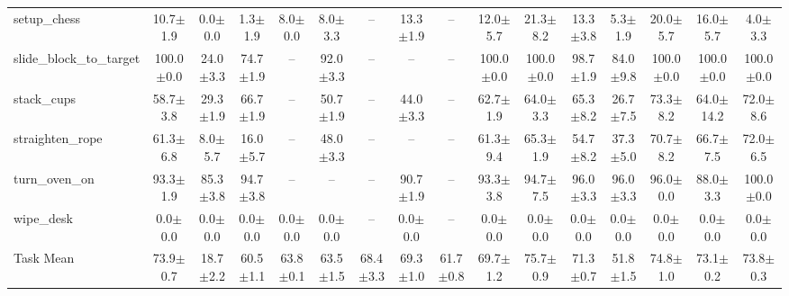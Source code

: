 \begin{table}[t]
{\begin{tabular}{l*{15}{c}}
setup\_chess & 10.7$\pm$1.9 & 0.0$\pm$0.0 & 1.3$\pm$1.9 & 8.0$\pm$0.0 & 8.0$\pm$3.3 & -- & 13.3$\pm$1.9 & -- & 12.0$\pm$5.7 & 21.3$\pm$8.2 & 13.3$\pm$3.8 & 5.3$\pm$1.9 & 20.0$\pm$5.7 & 16.0$\pm$5.7 & 4.0$\pm$3.3 \\
slide\_block\_to\_target & 100.0$\pm$0.0 & 24.0$\pm$3.3 & 74.7$\pm$1.9 & -- & 92.0$\pm$3.3 & -- & -- & -- & 100.0$\pm$0.0 & 100.0$\pm$0.0 & 98.7$\pm$1.9 & 84.0$\pm$9.8 & 100.0$\pm$0.0 & 100.0$\pm$0.0 & 100.0$\pm$0.0 \\
stack\_cups & 58.7$\pm$3.8 & 29.3$\pm$1.9 & 66.7$\pm$1.9 & -- & 50.7$\pm$1.9 & -- & 44.0$\pm$3.3 & -- & 62.7$\pm$1.9 & 64.0$\pm$3.3 & 65.3$\pm$8.2 & 26.7$\pm$7.5 & 73.3$\pm$8.2 & 64.0$\pm$14.2 & 72.0$\pm$8.6 \\
straighten\_rope & 61.3$\pm$6.8 & 8.0$\pm$5.7 & 16.0$\pm$5.7 & -- & 48.0$\pm$3.3 & -- & -- & -- & 61.3$\pm$9.4 & 65.3$\pm$1.9 & 54.7$\pm$8.2 & 37.3$\pm$5.0 & 70.7$\pm$8.2 & 66.7$\pm$7.5 & 72.0$\pm$6.5 \\
turn\_oven\_on & 93.3$\pm$1.9 & 85.3$\pm$3.8 & 94.7$\pm$3.8 & -- & -- & -- & 90.7$\pm$1.9 & -- & 93.3$\pm$3.8 & 94.7$\pm$7.5 & 96.0$\pm$3.3 & 96.0$\pm$3.3 & 96.0$\pm$0.0 & 88.0$\pm$3.3 & 100.0$\pm$0.0 \\
wipe\_desk & 0.0$\pm$0.0 & 0.0$\pm$0.0 & 0.0$\pm$0.0 & 0.0$\pm$0.0 & 0.0$\pm$0.0 & -- & 0.0$\pm$0.0 & -- & 0.0$\pm$0.0 & 0.0$\pm$0.0 & 0.0$\pm$0.0 & 0.0$\pm$0.0 & 0.0$\pm$0.0 & 0.0$\pm$0.0 & 0.0$\pm$0.0 \\
\midrule
Task Mean & 73.9$\pm$0.7 & 18.7$\pm$2.2 & 60.5$\pm$1.1 & 63.8$\pm$0.1 & 63.5$\pm$1.5 & 68.4$\pm$3.3 & 69.3$\pm$1.0 & 61.7$\pm$0.8 & 69.7$\pm$1.2 & 75.7$\pm$0.9 & 71.3$\pm$0.7 & 51.8$\pm$1.5 & 74.8$\pm$1.0 & 73.1$\pm$0.2 & 73.8$\pm$0.3 \\
\bottomrule
\end{tabular}%
}
\end{table}

